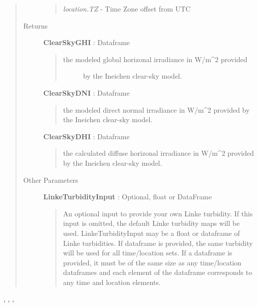 \documentclass[letterpaper,10pt,english]{sphinxmanual}
\begin{document}
\begin{fulllineitems}
\begin{quote}
\begin{description}
\begin{quote}
\emph{location.TZ}     - Time Zone offset from UTC
\end{quote}

\item[{Returns}] \leavevmode
\textbf{ClearSkyGHI} : Dataframe
\begin{quote}
\begin{description}
\item[{the modeled global horizonal irradiance in W/m\textasciicircum{}2 provided}] \leavevmode
by the Ineichen clear-sky model.

\end{description}
\end{quote}

\textbf{ClearSkyDNI} : Dataframe
\begin{quote}

the modeled direct normal irradiance in W/m\textasciicircum{}2 provided
by the Ineichen clear-sky model.
\end{quote}

\textbf{ClearSkyDHI} : Dataframe
\begin{quote}

the calculated diffuse horizonal irradiance in W/m\textasciicircum{}2 
provided by the Ineichen clear-sky model.
\end{quote}

\item[{Other Parameters}] \leavevmode
\textbf{LinkeTurbidityInput} : Optional, float or DataFrame
\begin{quote}

An optional input to provide your own Linke
turbidity. If this input is omitted, the default Linke turbidity
maps will be used. LinkeTurbidityInput may be a float or 
dataframe of Linke turbidities. If dataframe is provided, the same
turbidity will be used for all time/location sets. If a dataframe is
provided, it must be of the same size as any time/location dataframes
and each element of the dataframe corresponds to any time and location
elements.
\end{quote}

\end{description}\end{quote}




, {\hyperref[stubs/pvlib.pvl_makelocationstruct:pvlib.pvl_makelocationstruct]{}}, {\hyperref[stubs/pvlib.pvl_ephemeris:pvlib.pvl_ephemeris]{}}, 



\end{fulllineitems}
\end{document}
